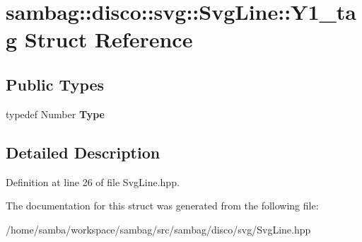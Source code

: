 \hypertarget{structsambag_1_1disco_1_1svg_1_1_svg_line_1_1_y1__tag}{
\section{sambag::disco::svg::SvgLine::Y1\_\-tag Struct Reference}
\label{structsambag_1_1disco_1_1svg_1_1_svg_line_1_1_y1__tag}
}
\subsection*{Public Types}
\begin{DoxyCompactItemize}
\item 
\hypertarget{structsambag_1_1disco_1_1svg_1_1_svg_line_1_1_y1__tag_a5f4e482c1d45adb2388eb8482893aa52}{
typedef Number {\bfseries Type}}
\label{structsambag_1_1disco_1_1svg_1_1_svg_line_1_1_y1__tag_a5f4e482c1d45adb2388eb8482893aa52}

\end{DoxyCompactItemize}


\subsection{Detailed Description}


Definition at line 26 of file SvgLine.hpp.



The documentation for this struct was generated from the following file:\begin{DoxyCompactItemize}
\item 
/home/samba/workspace/sambag/src/sambag/disco/svg/SvgLine.hpp\end{DoxyCompactItemize}
